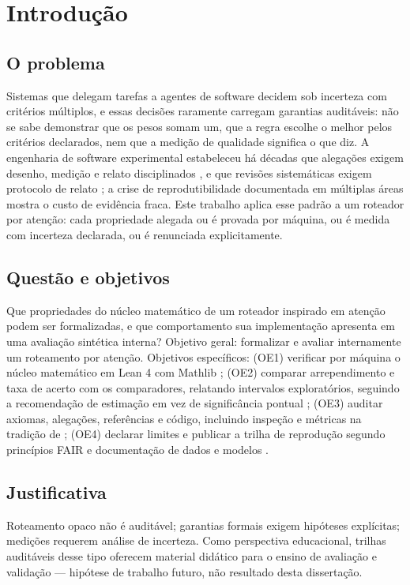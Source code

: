 \chapter{Introdução}\label{cap:intro}
\section{O problema}
Sistemas que delegam tarefas a agentes de software decidem sob incerteza com critérios múltiplos, e essas decisões raramente carregam garantias auditáveis: não se sabe demonstrar que os pesos somam um, que a regra escolhe o melhor pelos critérios declarados, nem que a medição de qualidade significa o que diz. A engenharia de software experimental estabeleceu há décadas que alegações exigem desenho, medição e relato disciplinados \cite{basili1986,wohlin2012,runeson2009}, e que revisões sistemáticas exigem protocolo de relato \cite{page2021}; a crise de reprodutibilidade documentada em múltiplas áreas \cite{osc2015,ioannidis2005,collberg2016} mostra o custo de evidência fraca. Este trabalho aplica esse padrão a um roteador por atenção: cada propriedade alegada ou é provada por máquina, ou é medida com incerteza declarada, ou é renunciada explicitamente.
\section{Questão e objetivos}
Que propriedades do núcleo matemático de um roteador inspirado em atenção podem ser formalizadas, e que comportamento sua implementação apresenta em uma avaliação sintética interna? Objetivo geral: formalizar e avaliar internamente um roteamento por atenção. Objetivos específicos: (OE1) verificar por máquina o núcleo matemático em Lean 4 com Mathlib \cite{moura2021,mathlib2020}; (OE2) comparar arrependimento e taxa de acerto com os comparadores, relatando intervalos exploratórios, seguindo a recomendação de estimação em vez de significância pontual \cite{cumming2014,wasserstein2016}; (OE3) auditar axiomas, alegações, referências e código, incluindo inspeção e métricas na tradição de \cite{fagan1976,mccabe1976,chidamber1994}; (OE4) declarar limites e publicar a trilha de reprodução segundo princípios FAIR \cite{wilkinson2016} e documentação de dados e modelos \cite{gebru2021,mitchell2019}.
\section{Justificativa}
Roteamento opaco não é auditável; garantias formais exigem hipóteses explícitas; medições requerem análise de incerteza. Como perspectiva educacional, trilhas auditáveis desse tipo oferecem material didático para o ensino de avaliação e validação --- hipótese de trabalho futuro, não resultado desta dissertação.
